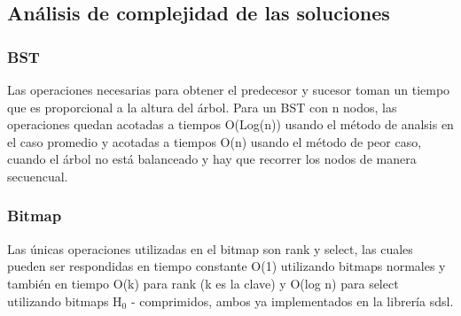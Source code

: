 \documentclass[11pt]{article}
\begin{document}
\subsection{Análisis de complejidad de las soluciones}
\subsubsection{BST}
Las operaciones necesarias para obtener el predecesor y sucesor toman un tiempo que es proporcional a la altura del árbol. Para un BST con n nodos, las operaciones quedan acotadas a tiempos O(Log(n)) usando el método de analsis en el caso promedio y acotadas a tiempos O(n) usando el método de peor caso, cuando el árbol no está balanceado y hay que recorrer los nodos de manera secuencual.
\subsubsection{Bitmap}
Las únicas operaciones utilizadas en el bitmap son rank y select, las cuales pueden ser respondidas en tiempo constante O(1) utilizando bitmaps normales y también en tiempo O(k) para rank (k es la clave) y O(log n)  para select utilizando bitmaps H$_{0}$ - comprimidos, ambos ya implementados en la librería sdsl.
\end{document}
